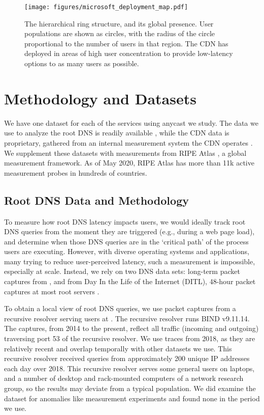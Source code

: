\documentclass[sigconf,letterpaper,nonacm,10pt,anonymous]{acmart}
\begin{document}
\begin{figure}
    \centering
    \texttt{[image: figures/microsoft\_deployment\_map.pdf]}
    \caption{The hierarchical ring structure, and its global presence. User populations are shown as circles, with the radius of the circle proportional to the number of users in that region. The CDN has deployed \feplural in areas of high user concentration to provide low-latency options to as many users as possible.}
    \label{fig:microsoft_deployment_map}
\end{figure}

\section{Methodology and Datasets}\label{methodology-and-datasets-1}

\label{sec:methodology_datasets}

We have one dataset for each of the services using anycast we study. The
data we use to analyze the root DNS is readily available \cite{ditl},
while the CDN data is proprietary, gathered from an internal measurement
system the CDN operates . We supplement these datasets with measurements
from RIPE Atlas \cite{staff2015ripe}, a global measurement framework. As
of May 2020, RIPE Atlas has more than 11k active measurement probes in
hundreds of countries.

\subsection{Root DNS Data and
Methodology}\label{root-dns-data-and-methodology-1}

\label{sec:root_dns_data_sources}

To measure how root DNS latency impacts users, we would ideally track
root DNS queries from the moment they are triggered (e.g., during a web
page load), and determine when those DNS queries are in the `critical
path' of the process users are executing. However, with diverse
operating systems and applications, many trying to reduce user-perceived
latency, such a measurement is impossible, especially at scale. Instead,
we rely on two DNS data sets: long-term packet captures from \ISIone,
and from Day In the Life of the Internet (DITL), 48-hour packet captures
at most root servers \cite{ditl}.

To obtain a local view of root DNS queries, we use packet captures from
a recursive resolver serving users at \ISIone. The recursive resolver
runs BIND v9.11.14. The captures, from 2014 to the present, reflect all
traffic (incoming and outgoing) traversing port 53 of the recursive
resolver. We use traces from 2018, as they are relatively recent and
overlap temporally with other datasets we use. This recursive resolver
received queries from approximately 200 unique IP addresses each day
over 2018. This recursive resolver serves some general users on laptops,
and a number of desktop and rack-mounted computers of a network research
group, so the results may deviate from a typical population. We did
examine the dataset for anomalies like measurement experiments and found
none in the period we use.
\end{document}
